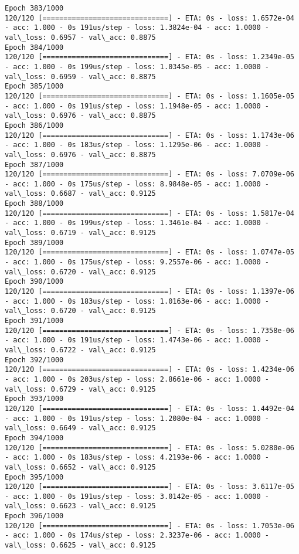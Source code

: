 \documentclass[11pt]{article}
\begin{document}
\begin{Verbatim}[commandchars=\\\{\}]
Epoch 383/1000
120/120 [==============================] - ETA: 0s - loss: 1.6572e-04 - acc: 1.000 - 0s 191us/step - loss: 1.3824e-04 - acc: 1.0000 - val\_loss: 0.6957 - val\_acc: 0.8875
Epoch 384/1000
120/120 [==============================] - ETA: 0s - loss: 1.2349e-05 - acc: 1.000 - 0s 199us/step - loss: 1.0345e-05 - acc: 1.0000 - val\_loss: 0.6959 - val\_acc: 0.8875
Epoch 385/1000
120/120 [==============================] - ETA: 0s - loss: 1.1605e-05 - acc: 1.000 - 0s 191us/step - loss: 1.1948e-05 - acc: 1.0000 - val\_loss: 0.6976 - val\_acc: 0.8875
Epoch 386/1000
120/120 [==============================] - ETA: 0s - loss: 1.1743e-06 - acc: 1.000 - 0s 183us/step - loss: 1.1295e-06 - acc: 1.0000 - val\_loss: 0.6976 - val\_acc: 0.8875
Epoch 387/1000
120/120 [==============================] - ETA: 0s - loss: 7.0709e-06 - acc: 1.000 - 0s 175us/step - loss: 8.9848e-05 - acc: 1.0000 - val\_loss: 0.6687 - val\_acc: 0.9125
Epoch 388/1000
120/120 [==============================] - ETA: 0s - loss: 1.5817e-04 - acc: 1.000 - 0s 199us/step - loss: 1.3461e-04 - acc: 1.0000 - val\_loss: 0.6719 - val\_acc: 0.9125
Epoch 389/1000
120/120 [==============================] - ETA: 0s - loss: 1.0747e-05 - acc: 1.000 - 0s 175us/step - loss: 9.2557e-06 - acc: 1.0000 - val\_loss: 0.6720 - val\_acc: 0.9125
Epoch 390/1000
120/120 [==============================] - ETA: 0s - loss: 1.1397e-06 - acc: 1.000 - 0s 183us/step - loss: 1.0163e-06 - acc: 1.0000 - val\_loss: 0.6720 - val\_acc: 0.9125
Epoch 391/1000
120/120 [==============================] - ETA: 0s - loss: 1.7358e-06 - acc: 1.000 - 0s 191us/step - loss: 1.4743e-06 - acc: 1.0000 - val\_loss: 0.6722 - val\_acc: 0.9125
Epoch 392/1000
120/120 [==============================] - ETA: 0s - loss: 1.4234e-06 - acc: 1.000 - 0s 203us/step - loss: 2.8661e-06 - acc: 1.0000 - val\_loss: 0.6729 - val\_acc: 0.9125
Epoch 393/1000
120/120 [==============================] - ETA: 0s - loss: 1.4492e-04 - acc: 1.000 - 0s 191us/step - loss: 1.2080e-04 - acc: 1.0000 - val\_loss: 0.6649 - val\_acc: 0.9125
Epoch 394/1000
120/120 [==============================] - ETA: 0s - loss: 5.0280e-06 - acc: 1.000 - 0s 183us/step - loss: 4.2193e-06 - acc: 1.0000 - val\_loss: 0.6652 - val\_acc: 0.9125
Epoch 395/1000
120/120 [==============================] - ETA: 0s - loss: 3.6117e-05 - acc: 1.000 - 0s 191us/step - loss: 3.0142e-05 - acc: 1.0000 - val\_loss: 0.6623 - val\_acc: 0.9125
Epoch 396/1000
120/120 [==============================] - ETA: 0s - loss: 1.7053e-06 - acc: 1.000 - 0s 174us/step - loss: 2.3237e-06 - acc: 1.0000 - val\_loss: 0.6625 - val\_acc: 0.9125

\end{Verbatim}
\end{document}
